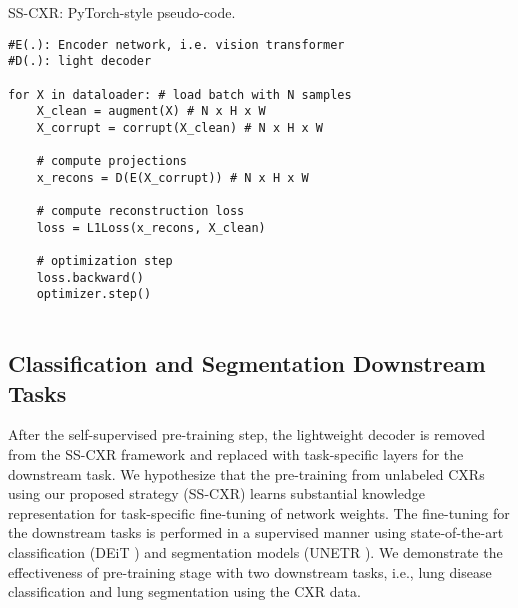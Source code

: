 \documentclass[10pt,journal,compsoc]{IEEEtran}
\begin{document}
\begin{algorithm}[!th]
\caption{\mbox{SS-CXR}: PyTorch-style pseudo-code.}
\label{algo:sitml}
\begin{lstlisting}
#E(.): Encoder network, i.e. vision transformer
#D(.): light decoder 

for X in dataloader: # load batch with N samples
    X_clean = augment(X) # N x H x W
    X_corrupt = corrupt(X_clean) # N x H x W
    
    # compute projections
    x_recons = D(E(X_corrupt)) # N x H x W
    
    # compute reconstruction loss
    loss = L1Loss(x_recons, X_clean)    
    
    # optimization step
    loss.backward()
    optimizer.step()


\end{lstlisting}
\end{algorithm}

\subsection{Classification and Segmentation Downstream Tasks}
\label{sec:downstream}
 
 After the self-supervised pre-training step, the lightweight decoder is removed from the SS-CXR framework and replaced with task-specific layers for the downstream task. We hypothesize that the pre-training from unlabeled CXRs using our proposed strategy (SS-CXR) learns substantial knowledge representation for task-specific fine-tuning of network weights. The fine-tuning for the downstream tasks is performed in a supervised manner using state-of-the-art classification (DEiT \cite{pmlr-v139-touvron21a}) and segmentation models (UNETR \cite{unetr}). We demonstrate the effectiveness of pre-training stage with two downstream tasks, i.e., lung disease classification and lung segmentation using the CXR data. 
\end{document}
